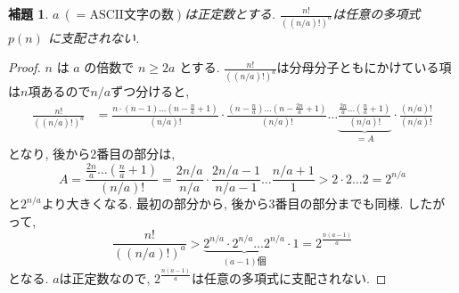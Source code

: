 \documentclass[11pt]{jsarticle}
\newtheorem{lemma}{補題}
\begin{document}
\begin{lemma}
$a\ (= \mathrm{ASCII文字の数})$は正定数とする. $\frac{n!}{((n/a)!)^a}$は任意の多項式 $p(n)$ に支配されない.
\end{lemma}
\begin{proof}
    $n$ は $a$ の倍数で $n \ge 2a$ とする. $\frac{n!}{((n/a)!)^a}$は分母分子ともにかけている項は$n$項あるので$n/a$ずつ分けると,
    \begin{align*}
        \frac{n!}{((n/a)!)^a}
        &= \frac{n\cdot(n-1) \dots (n- \frac{n}{a}+1)}{(n/a)!}\cdot
        \frac{(n-\frac{n}{a}) \dots (n-\frac{2n}{a}+1)}{(n/a)!}\dots
        \underbrace{\frac{\frac{2n}{a}\dots (\frac{n}{a}+1)}{(n/a)!}}_{= A}
        \cdot\frac{(n/a)!}{(n/a)!}
    \end{align*}
    となり, 後から2番目の部分は,
    \[
        A = \frac{\frac{2n}{a}\dots (\frac{n}{a}+1)}{(n/a)!}
        = \frac{2n/a}{n/a}\cdot \frac{2n/a -1}{n/a-1}\dots \frac{n/a+1}{1}
        > 2\cdot 2 \dots 2
        = 2^{n/a}
    \]
    と$2^{n/a}$より大きくなる. 最初の部分から, 後から3番目の部分までも同様. したがって,
    \[ \frac{n!}{((n/a)!)^a} > \underbrace{2^{n/a} \cdot 2^{n/a} \dots 2^{n/a}}_{(a-1)\text{個}} \cdot 1 = 2^{\frac{n(a-1)}{a}} \]
    となる. $a$は正定数なので, $2^{\frac{n(a-1)}{a}}$は任意の多項式に支配されない.
\end{proof}
\end{document}
